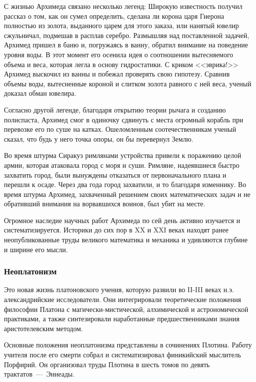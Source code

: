 С жизнью Архимеда связано несколько легенд:
Широкую известность получил рассказ о том, как он сумел определить, сделана ли корона царя Гиерона полностью из золота, выданного царем для этого заказа, или нанятый ювелир сжульничал, подмешав в расплав серебро. Размышляя над поставленной задачей, Архимед пришел в баню и, погружаясь в ванну, обратил внимание на поведение уровня воды. В этот момент его осенила идея о соотношении вытесняемого объема и веса, которая легла в основу гидростатики. С криком <<эврика!>> Архимед выскочил из ванны и побежал проверять свою гипотезу. Сравнив объемы воды, вытесненные короной и слитком золота равного с ней веса, ученый доказал обман ювелира. 

Согласно другой легенде, благодаря открытию теории рычага и созданию полиспаста, Архимед смог в одиночку сдвинуть с места огромный корабль при перевозке его по суше на катках. Ошеломленным соотечественникам ученый сказал, что будь у него точка опоры, он бы перевернул Землю. 

Во время штурма Сиракуз римлянами устройства привели к поражению целой армии, которая атаковала город с моря и суши. Римляне, надеявшиеся быстро захватить город, были вынуждены отказаться от первоначального плана и перешли к осаде. Через два года город захватили, и то благодаря изменнику. Во время штурма Архимед, захваченный решением своих математических задач и не обративший внимания на ворвавшихся воинов, был убит на месте. 

Огромное наследие научных работ Архимеда по сей день активно изучается и систематизируется. Историки до сих пор в XX и XXI веках находят ранее неопубликованные труды великого математика и механика и удивляются
глубине и ширине его мысли. 

\subsubsection{Неоплатонизм}

Это новая жизнь платоновского учения, которую развили во II-III веках н.э.
александрийские исследователи. Они интегрировали теоретические положения
философии Платона с магически-мистической, алхимической и астрономической
практиками, а также синтезировали наработанные предшественниками знания 
аристотелевским методом. 

Основные положения неоплатонизма представлены в сочинениях Плотина. Работу учителя после его смерти собрал и систематизировал финикийский мыслитель Порфирий. Он организовал труды Плотина в шесть томов по девять трактатов~---~Эннеады.

